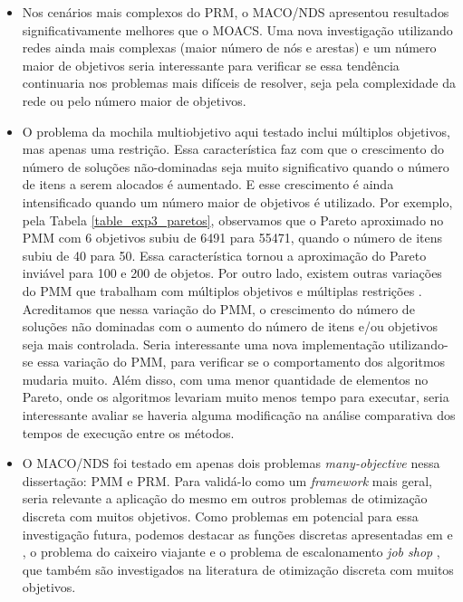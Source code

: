 \begin{itemize}
	\item Nos cenários mais complexos do PRM, o MACO/NDS apresentou resultados significativamente melhores que o MOACS. Uma nova investigação utilizando redes ainda mais complexas (maior número de nós e arestas) e um número maior de objetivos seria interessante para verificar se essa tendência continuaria nos problemas mais difíceis de resolver, seja pela complexidade da rede ou pelo número maior de objetivos.

	\item O problema da mochila multiobjetivo aqui testado inclui múltiplos objetivos, mas apenas uma restrição. Essa característica faz com que o crescimento do número de soluções não-dominadas seja muito significativo quando o número de itens a serem alocados é aumentado. E esse crescimento é ainda intensificado quando um número maior de objetivos é utilizado. Por exemplo, pela Tabela \ref{table_exp3_paretos}, observamos  que o Pareto aproximado no PMM com 6 objetivos subiu de 6491 para 55471, quando o número de itens subiu de 40 para 50. Essa característica tornou a aproximação do Pareto inviável para 100 e 200 de objetos. Por outro lado, existem outras variações do PMM que trabalham com múltiplos objetivos e múltiplas restrições \cite{Ishibuchi2015,Alaya2007}. Acreditamos que nessa variação do PMM, o crescimento do número de soluções não dominadas com o aumento do número de itens e/ou objetivos seja mais controlada. Seria interessante uma nova implementação utilizando-se essa variação do PMM, para verificar se o comportamento dos algoritmos mudaria muito. Além disso, com uma menor quantidade de elementos no Pareto, onde os algoritmos levariam muito menos tempo para executar, seria interessante avaliar se haveria alguma modificação na análise comparativa dos tempos de execução entre os métodos.
	
	\item O MACO/NDS foi testado em apenas dois problemas \textit{many-objective} nessa dissertação: PMM e PRM. Para validá-lo como um \textit{framework} mais geral, seria relevante a aplicação do mesmo em outros problemas de otimização discreta com muitos objetivos. Como problemas em potencial para essa investigação futura, podemos destacar as funções discretas apresentadas em \cite{DiscreteFunctions1} e  \cite{DiscreteFunctions2}, o problema do caixeiro viajante \cite{Riveros2016} e o problema de escalonamento \textit{job shop} \cite{JobShop}, que também são investigados na literatura de otimização discreta com muitos objetivos.
	

\end{itemize}

